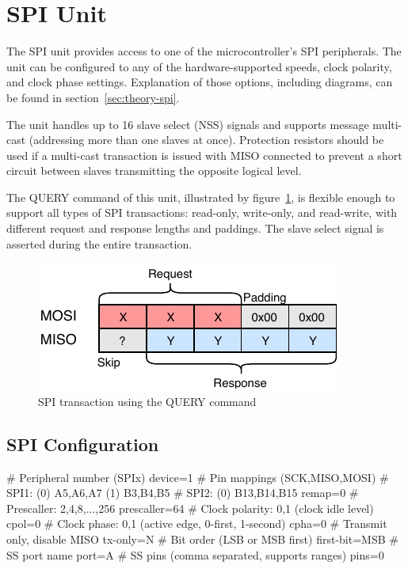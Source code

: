 \section{SPI Unit}

The \gls{SPI} unit provides access to one of the microcontroller's \gls{SPI} peripherals. The unit can be configured to any of the hardware-supported speeds, clock polarity, and clock phase settings. Explanation of those options, including diagrams, can be found in section~\ref{sec:theory-spi}.

The unit handles up to 16 slave select (\gls{NSS}) signals and supports message multi-cast (addressing more than one slaves at once). Protection resistors should be used if a multi-cast transaction is issued with \gls{MISO} connected to prevent a short circuit between slaves transmitting the opposite logical level.

The QUERY command of this unit, illustrated by figure~\ref{fig:spi_query}, is flexible enough to support all types of \gls{SPI} transactions: read-only, write-only, and read-write, with different request and response lengths and paddings. The slave select signal is asserted during the entire transaction.

\begin{figure}[h]
	\centering
	\includegraphics[scale=1.1] {img/spi-query.pdf}
	\caption{\label{fig:spi_query}SPI transaction using the QUERY command}
\end{figure}

\subsection{SPI Configuration}

\begin{inicode}
# Peripheral number (SPIx)
device=1
# Pin mappings (SCK,MISO,MOSI)
#  SPI1: (0) A5,A6,A7     (1) B3,B4,B5
#  SPI2: (0) B13,B14,B15
remap=0
# Prescaller: 2,4,8,...,256
prescaller=64
# Clock polarity: 0,1 (clock idle level)
cpol=0
# Clock phase: 0,1 (active edge, 0-first, 1-second)
cpha=0
# Transmit only, disable MISO
tx-only=N
# Bit order (LSB or MSB first)
first-bit=MSB
# SS port name
port=A
# SS pins (comma separated, supports ranges)
pins=0
\end{inicode}

